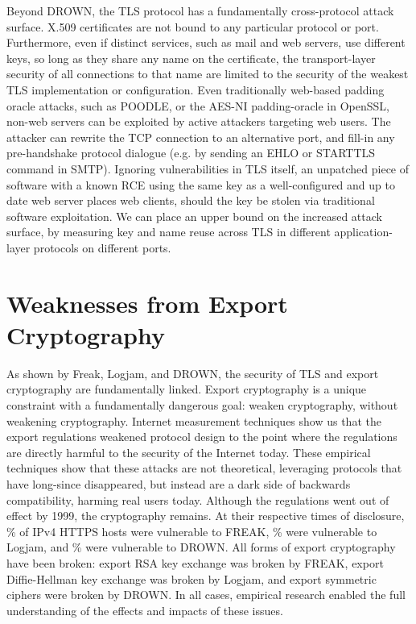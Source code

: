 Beyond DROWN, the TLS protocol has a fundamentally cross-protocol attack
surface. X.509 certificates are not bound to any particular protocol or port.
Furthermore, even if distinct services, such as mail and web servers, use
different keys, so long as they share any name on the certificate, the
transport-layer security of all connections to that name are limited to the
security of the weakest TLS implementation or configuration. Even traditionally
web-based padding oracle attacks, such as POODLE, or the AES-NI padding-oracle
in OpenSSL, non-web servers can be exploited by active attackers targeting web
users. The attacker can rewrite the TCP connection to an alternative port, and
fill-in any pre-handshake protocol dialogue (e.g. by sending an EHLO or
STARTTLS command in SMTP). Ignoring vulnerabilities in TLS itself, an unpatched
piece of software with a known RCE using the same key as a well-configured and
up to date web server places web clients, should the key be stolen via
traditional software exploitation. We can place an upper bound on the increased
attack surface, by measuring key and name reuse across TLS in different
application-layer protocols on different ports.

\section{Weaknesses from Export Cryptography}


As shown by Freak, Logjam, and DROWN, the security of TLS and export
cryptography are fundamentally linked. Export cryptography is a unique
constraint with a fundamentally dangerous goal: weaken cryptography, without
weakening cryptography. Internet measurement techniques show us that the export
regulations weakened protocol design to the point where the regulations are
directly harmful to the security of the Internet today. These empirical
techniques show that these attacks are not theoretical, leveraging protocols
that have long-since disappeared, but instead are a dark side of backwards
compatibility, harming real users today. Although the regulations went out of
effect by 1999, the cryptography remains. At their respective times of
disclosure, \TK\% of IPv4 HTTPS hosts were vulnerable to FREAK, \TK\% were
vulnerable to Logjam, and \TK\% were vulnerable to DROWN. All forms of export
cryptography have been broken: export RSA key exchange was broken by FREAK,
export Diffie-Hellman key exchange was broken by Logjam, and export symmetric
ciphers were broken by DROWN. In all cases, empirical research enabled the full
understanding of the effects and impacts of these issues.

